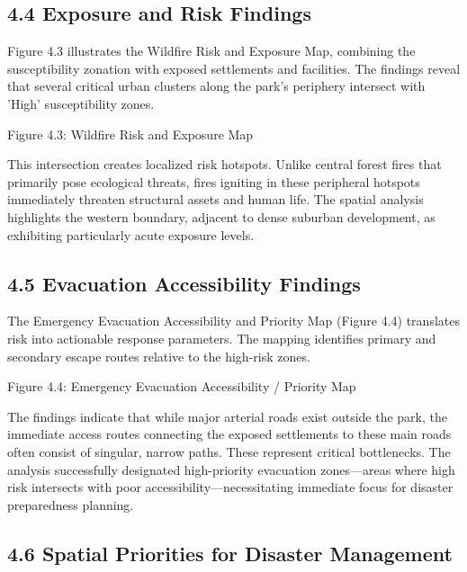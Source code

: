 \documentclass[12pt,a4paper]{article}
\begin{document}
\subsection*{4.4 Exposure and Risk Findings}

Figure 4.3 illustrates the Wildfire Risk and Exposure Map, combining the susceptibility zonation with exposed settlements and facilities. The findings reveal that several critical urban clusters along the park's periphery intersect with 'High' susceptibility zones.


Figure 4.3: Wildfire Risk and Exposure Map


This intersection creates localized risk hotspots. Unlike central forest fires that primarily pose ecological threats, fires igniting in these peripheral hotspots immediately threaten structural assets and human life. The spatial analysis highlights the western boundary, adjacent to dense suburban development, as exhibiting particularly acute exposure levels.



\subsection*{4.5 Evacuation Accessibility Findings}

The Emergency Evacuation Accessibility and Priority Map (Figure 4.4) translates risk into actionable response parameters. The mapping identifies primary and secondary escape routes relative to the high-risk zones.


Figure 4.4: Emergency Evacuation Accessibility / Priority Map


The findings indicate that while major arterial roads exist outside the park, the immediate access routes connecting the exposed settlements to these main roads often consist of singular, narrow paths. These represent critical bottlenecks. The analysis successfully designated high-priority evacuation zones—areas where high risk intersects with poor accessibility—necessitating immediate focus for disaster preparedness planning.



\subsection*{4.6 Spatial Priorities for Disaster Management}
\end{document}
